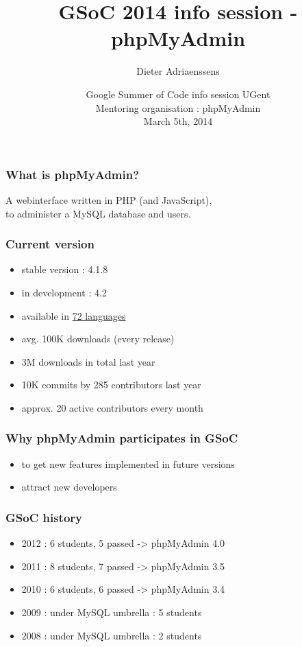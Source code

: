 \documentclass[14pt]{beamer}
\title{GSoC 2014 info session - phpMyAdmin}
\author{Dieter Adriaenssens}
\institute[phpMyAdmin]{phpMyAdmin GSoC mentor 2011-2013}
\date[5Mar2014]{Google Summer of Code info session UGent\\
Mentoring organisation : phpMyAdmin\\
March 5th, 2014}
\begin{document}
  \begin{frame}
  \titlepage
  \end{frame}
  \begin{frame}
    \frametitle{What is phpMyAdmin?}
      A webinterface written in PHP (and JavaScript),\\
      to administer a MySQL database and users.
  \end{frame}
  \begin{frame}
    \frametitle{Current version}
    \begin{itemize}
      \item stable version : 4.1.8
      \item in development : 4.2
      \item available in \href{http://www.phpmyadmin.net/home\_page/translations.php}{72 languages}
      \item avg. 100K downloads (every release)
      \item 3M downloads in total last year
      \item 10K commits by 285 contributors last year
      \item approx. 20 active contributors every month
    \end{itemize}
  \end{frame}
  \begin{frame}
    \frametitle{Why phpMyAdmin participates in GSoC}
    \begin{itemize}
      \item to get new features implemented in future versions
      \item attract new developers
    \end{itemize}
  \end{frame}
  \begin{frame}
    \frametitle{GSoC history}
    \begin{itemize}
      \item 2012 : 6 students, 5 passed -> phpMyAdmin 4.0
      \item 2011 : 8 students, 7 passed -> phpMyAdmin 3.5
      \item 2010 : 6 students, 6 passed -> phpMyAdmin 3.4
      \item 2009 : under MySQL umbrella : 5 students
      \item 2008 : under MySQL umbrella : 2 students
    \end{itemize}
  \end{frame}
\end{document}
